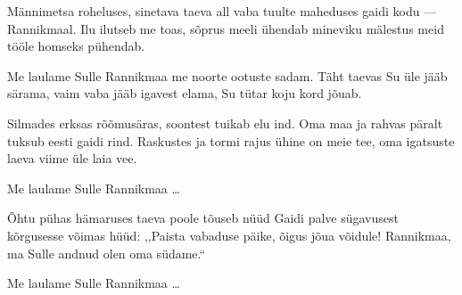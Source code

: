 M\"annimetsa roheluses,
sinetava taeva all
vaba tuulte maheduses
gaidi kodu --- Rannikmaal.
Ilu ilutseb me toas,
s\~oprus meeli \"uhendab
mineviku m\"alestus meid
t\"o\"ole homseks p\"uhendab.

Me laulame Sulle Rannikmaa
me noorte ootuste sadam.
T\"aht taevas Su \"ule j\"a\"ab s\"arama,
vaim vaba j\"a\"ab igavest elama,
Su t\"utar koju kord j\~ouab.

Silmades erksas r\~o\~omus\"aras,
soontest tuikab elu ind.  
Oma maa ja rahvas p\"aralt
tuksub eesti gaidi rind.
Raskustes ja tormi rajus
\"uhine on meie tee,
oma igatsuste laeva
viime \"ule laia vee.

Me laulame Sulle Rannikmaa \ldots

\~Ohtu p\"uhas h\"amaruses
taeva poole t\~ouseb n\"u\"ud
Gaidi palve s\"ugavusest
k\~orgusesse v\~oimas h\"u\"ud:
,,Paista vabaduse p\"aike,
\~oigus j\~oua v\~oidule!
Rannikmaa, ma Sulle andnud
olen oma s\"udame.{``}

Me laulame Sulle Rannikmaa \ldots